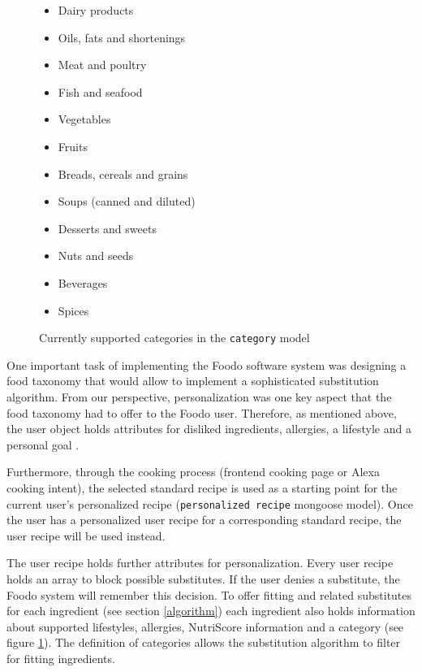 \begin{figure}[ht]
	\captionsetup{justification=centering}
	\begin{itemize} 
		\itemsep-0.5em 
		\item Dairy products
		\item Oils, fats and shortenings	
		\item Meat and poultry	
		\item Fish and seafood
		\item Vegetables	
		\item Fruits	
		\item Breads, cereals and grains	
		\item Soups (canned and diluted)	
		\item Desserts and sweets	
		\item Nuts and seeds	
		\item Beverages
		\item Spices
	\end{itemize}
	\caption{Currently supported categories in the \texttt{category} model}
	\label{categories}
\end{figure}


One important task of implementing the Foodo software system was designing a food taxonomy that would allow to implement a sophisticated substitution algorithm. From our perspective, personalization was one key aspect that the food taxonomy had to offer to the Foodo user. Therefore, as mentioned above, the user object holds attributes for disliked ingredients, allergies, a lifestyle and a personal goal . 

Furthermore, through the cooking process (frontend cooking page or Alexa cooking intent), the selected standard recipe is used as a starting point for the current user's personalized recipe (\texttt{personalized recipe} mongoose model). Once the user has a personalized user recipe for a corresponding standard recipe, the user recipe will be used instead. 

The user recipe holds further attributes for personalization. Every user recipe holds an array to block possible substitutes. If the user denies a substitute, the Foodo system will remember this decision. To offer fitting and related substitutes for each ingredient (see section \ref{algorithm}) each ingredient also holds information about supported lifestyles, allergies, NutriScore information and a category (see figure \ref{categories}). The definition of categories allows the substitution algorithm to filter for fitting ingredients. 

